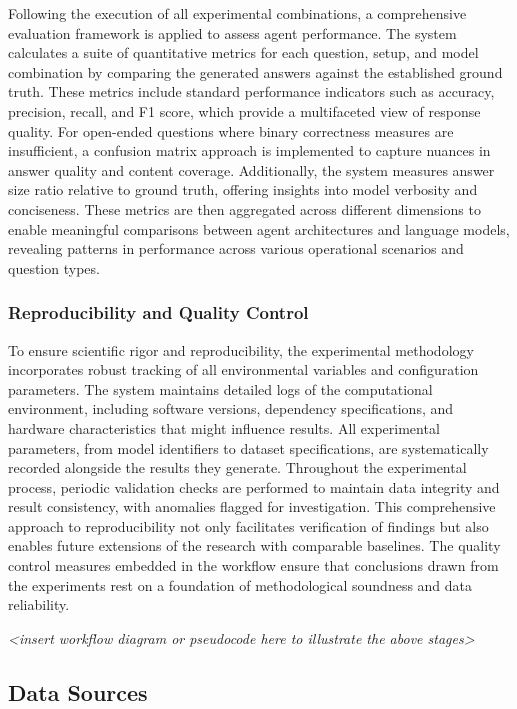                 Following the execution of all experimental combinations, a comprehensive evaluation framework is applied to assess agent performance. The system calculates a suite of quantitative metrics for each question, setup, and model combination by comparing the generated answers against the established ground truth. These metrics include standard performance indicators such as accuracy, precision, recall, and F1 score, which provide a multifaceted view of response quality. For open-ended questions where binary correctness measures are insufficient, a confusion matrix approach is implemented to capture nuances in answer quality and content coverage. Additionally, the system measures answer size ratio relative to ground truth, offering insights into model verbosity and conciseness. These metrics are then aggregated across different dimensions to enable meaningful comparisons between agent architectures and language models, revealing patterns in performance across various operational scenarios and question types.

            \subsubsection{Reproducibility and Quality Control}

                To ensure scientific rigor and reproducibility, the experimental methodology incorporates robust tracking of all environmental variables and configuration parameters. The system maintains detailed logs of the computational environment, including software versions, dependency specifications, and hardware characteristics that might influence results. All experimental parameters, from model identifiers to dataset specifications, are systematically recorded alongside the results they generate. Throughout the experimental process, periodic validation checks are performed to maintain data integrity and result consistency, with anomalies flagged for investigation. This comprehensive approach to reproducibility not only facilitates verification of findings but also enables future extensions of the research with comparable baselines. The quality control measures embedded in the workflow ensure that conclusions drawn from the experiments rest on a foundation of methodological soundness and data reliability.

                \textit{<insert workflow diagram or pseudocode here to illustrate the above stages>}

        \subsection{Data Sources}

